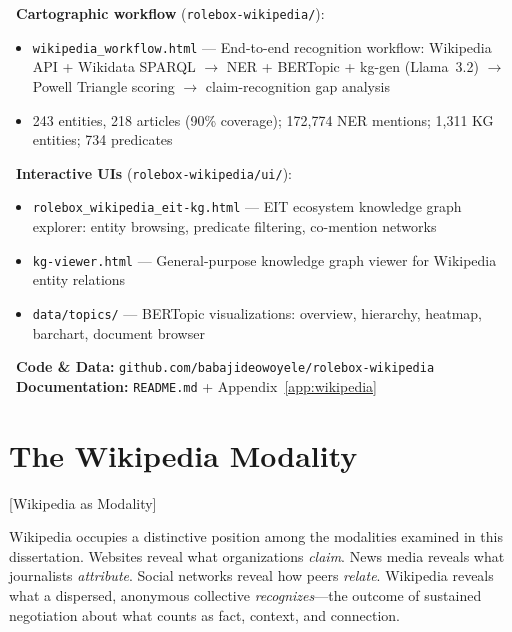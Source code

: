\documentclass[../main.tex]{subfiles}
\begin{document}
\begin{replicationbox}
\faLaptopCode\ \textbf{Cartographic workflow} (\texttt{rolebox-wikipedia/}):
\begin{itemize}[leftmargin=*, itemsep=0.1em]
    \item \texttt{wikipedia\_workflow.html} --- End-to-end recognition workflow: Wikipedia API + Wikidata SPARQL $\rightarrow$ NER + BERTopic + kg-gen (Llama~3.2) $\rightarrow$ Powell Triangle scoring $\rightarrow$ claim-recognition gap analysis
    \item 243 entities, 218 articles (90\% coverage); 172,774 NER mentions; 1,311 KG entities; 734 predicates
\end{itemize}
\faLaptopCode\ \textbf{Interactive UIs} (\texttt{rolebox-wikipedia/ui/}):
\begin{itemize}[leftmargin=*, itemsep=0.1em]
    \item \texttt{rolebox\_wikipedia\_eit-kg.html} --- EIT ecosystem knowledge graph explorer: entity browsing, predicate filtering, co-mention networks
    \item \texttt{kg-viewer.html} --- General-purpose knowledge graph viewer for Wikipedia entity relations
    \item \texttt{data/topics/} --- BERTopic visualizations: overview, hierarchy, heatmap, barchart, document browser
\end{itemize}
\faGithub\ \textbf{Code \& Data:} \texttt{github.com/babajideowoyele/rolebox-wikipedia}\\
\faBook\ \textbf{Documentation:} \texttt{README.md} + Appendix~\ref{app:wikipedia}
\end{replicationbox}


\section{The Wikipedia Modality}[Wikipedia as Modality]

Wikipedia occupies a distinctive position among the modalities examined in this dissertation. Websites reveal what organizations \emph{claim}. News media reveals what journalists \emph{attribute}. Social networks reveal how peers \emph{relate}. Wikipedia reveals what a dispersed, anonymous collective \emph{recognizes}---the outcome of sustained negotiation about what counts as fact, context, and connection.
\end{document}
